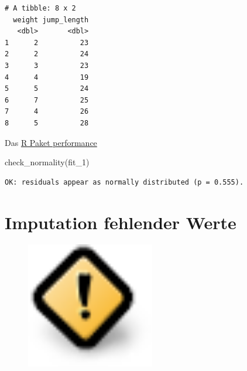 \documentclass[
  letterpaper,
]{scrbook}
\newenvironment{Shaded}{\begin{snugshade}}{\end{snugshade}}
\newcommand{\FunctionTok}[1]{\textcolor[rgb]{0.28,0.35,0.67}{#1}}
\newcommand{\NormalTok}[1]{\textcolor[rgb]{0.00,0.23,0.31}{#1}}
\newcommand{\OtherTok}[1]{\textcolor[rgb]{0.00,0.23,0.31}{#1}}
\newcommand{\SpecialCharTok}[1]{\textcolor[rgb]{0.37,0.37,0.37}{#1}}
\begin{document}
\begin{Shaded}
\end{Shaded}

\begin{verbatim}
# A tibble: 8 x 2
  weight jump_length
   <dbl>       <dbl>
1      2          23
2      2          24
3      3          23
4      4          19
5      5          24
6      7          25
7      4          26
8      5          28
\end{verbatim}

Das \href{https://easystats.github.io/performance/}{R Paket performance}

\begin{Shaded}
\begin{Highlighting}[]
\FunctionTok{check\_normality}\NormalTok{(fit\_1)}
\end{Highlighting}
\end{Shaded}

\begin{verbatim}
OK: residuals appear as normally distributed (p = 0.555).
\end{verbatim}

\hypertarget{imputation-fehlender-werte}{%
\chapter{Imputation fehlender Werte}\label{imputation-fehlender-werte}}

\begin{figure}

{\centering \includegraphics[width=0.5\textwidth,height=\textheight]{./images/caution.png}

}

\end{figure}
\end{document}
